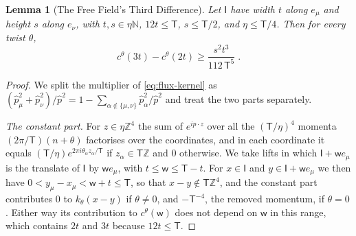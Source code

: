 \documentclass[11pt]{preprint}
\numberwithin{equation}{section}
\newtheorem{lemma}[theorem]{Lemma}
\theoremstyle{definition}
\theoremstyle{remark}
\theoremstyle{plain}
\begin{document}
\begin{lemma}[The Free Field's Third Difference]\label{lem:free-field}
Let $\mathsf I$ have width $t$ along $e_\mu$ and height $s$ along $e_\nu$, with $t, s \in \eta\mathbb N$, $12t \leq \mathsf T$, $s \leq \mathsf T/2$, and $\eta \leq \mathsf T/4$. Then for every twist $\theta$,
\begin{equation}\label{eq:free-field}
    c^\theta(3t) - c^\theta(2t) \geq \frac{s^2t^3}{112\,\mathsf T^5}\;.
\end{equation}
\end{lemma}

\begin{proof}
We split the multiplier of \eqref{eq:flux-kernel} as $(\hat p_\mu^2 + \hat p_\nu^2)/\hat p^2 = 1 - \sum_{\alpha \notin \{ \mu, \nu \}}\hat p_\alpha^2/\hat p^2$ and treat the two parts separately.

\emph{The constant part.} For $z \in \eta\mathbb Z^4$ the sum of $e^{ip\cdot z}$ over all the $(\mathsf T/\eta)^4$ momenta $(2\pi/\mathsf T)(n + \theta)$ factorises over the coordinates, and in each coordinate it equals $(\mathsf T/\eta)e^{2\pi i\theta_\alpha z_\alpha/\mathsf T}$ if $z_\alpha \in \mathsf T\mathbb Z$ and $0$ otherwise. We take lifts in which $\mathsf I + \mathsf we_\mu$ is the translate of $\mathsf I$ by $\mathsf we_\mu$, with $t \leq \mathsf w \leq \mathsf T - t$. For $x \in \mathsf I$ and $y \in \mathsf I + \mathsf we_\mu$ we then have $0 < y_\mu - x_\mu < \mathsf w + t \leq \mathsf T$, so that $x - y \notin \mathsf T\mathbb Z^4$, and the constant part contributes $0$ to $k_\theta(x - y)$ if $\theta \neq 0$, and $-\mathsf T^{-4}$, the removed momentum, if $\theta = 0$. Either way its contribution to $c^\theta(\mathsf w)$ does not depend on $\mathsf w$ in this range, which contains $2t$ and $3t$ because $12t \leq \mathsf T$.


\end{proof}
\end{document}
